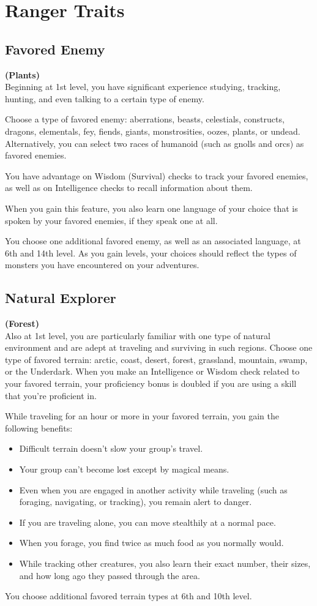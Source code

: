 {\section*{Ranger Traits}
\subsection*{Favored Enemy}
\textbf{(Plants)}\\
Beginning at 1st level, you have significant experience studying, tracking, hunting, and even talking to a certain type of enemy.

Choose a type of favored enemy: aberrations, beasts, celestials, constructs, dragons, elementals, fey, fiends, giants, monstrosities, oozes, plants, or undead. Alternatively, you can select two races of humanoid (such as gnolls and orcs) as favored enemies.

You have advantage on Wisdom (Survival) checks to track your favored enemies, as well as on Intelligence checks to recall information about them.

When you gain this feature, you also learn one language of your choice that is spoken by your favored enemies, if they speak one at all.

You choose one additional favored enemy, as well as an associated language, at 6th and 14th level. As you gain levels, your choices should reflect the types of monsters you have encountered on your adventures.
\subsection*{Natural Explorer}
\textbf{(Forest)}\\
Also at 1st level, you are particularly familiar with one type of natural environment and are adept at traveling and surviving in such regions. Choose one type of favored terrain: arctic, coast, desert, forest, grassland, mountain, swamp, or the Underdark. When you make an Intelligence or Wisdom check related to your favored terrain, your proficiency bonus is doubled if you are using a skill that you’re proficient in.

While traveling for an hour or more in your favored terrain, you gain the following benefits:
\begin{itemize}
	\item Difficult terrain doesn’t slow your group’s travel.
	\item Your group can’t become lost except by magical means.
	\item Even when you are engaged in another activity while traveling (such as foraging, navigating, or tracking), you remain alert to danger.
	\item If you are traveling alone, you can move stealthily at a normal pace.
	\item When you forage, you find twice as much food as you normally would.
	\item While tracking other creatures, you also learn their exact number, their sizes, and how long ago they passed through the area.
\end{itemize}
You choose additional favored terrain types at 6th and 10th level.
}
